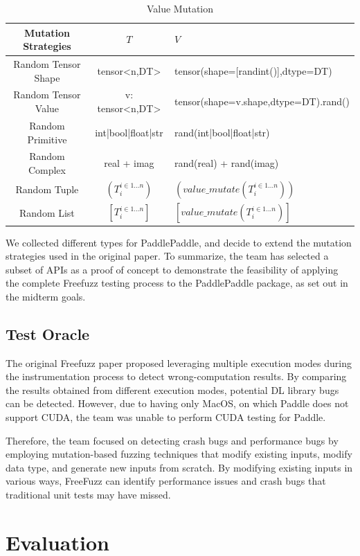 \documentclass[sigconf]{acmart}
\begin{document}
  \begin{table}[h]
    \centering
    \caption{Value Mutation}
    \label{tab:freq}
    \begin{tabular}{ccl}
      \toprule
      Mutation Strategies&$T$&$V$\\
      \midrule
      Random Tensor Shape& tensor<n,DT>& tensor(shape=[randint()],dtype=DT)\\
      Random Tensor Value& v: tensor<n,DT>& tensor(shape=v.shape,dtype=DT).rand()\\
      Random Primitive& int|bool|float|str & rand(int|bool|float|str)\\
      Random Complex& real + imag & rand(real) + rand(imag)\\
      Random Tuple& $(T_i ^ {i\in 1...n})$&$(value\_mutate(T_i ^ {i\in 1...n}))$ \\
      Random List& $[T_i ^ {i\in 1...n}]$&$[value\_mutate(T_i ^ {i\in 1...n})]$ \\
    \bottomrule
  \end{tabular}
  \end{table}


  We collected different types for PaddlePaddle, and decide to extend the mutation strategies used in the original paper.
  To summarize, the team has selected a subset of APIs as a proof of concept to 
  demonstrate the feasibility of applying the complete Freefuzz testing process to the PaddlePaddle package, 
  as set out in the midterm goals.

  \subsection{Test Oracle}
  The original Freefuzz paper proposed leveraging multiple execution modes during the instrumentation process to detect wrong-computation results. 
  By comparing the results obtained from different execution modes, potential DL library bugs can be detected. However, due to having only MacOS, 
  on which Paddle does not support CUDA, the team was unable to perform CUDA testing for Paddle.

  Therefore, the team focused on detecting crash bugs and performance bugs by employing mutation-based fuzzing techniques that modify existing inputs, modify data type, and generate new inputs from scratch. 
  By modifying existing inputs in various ways, FreeFuzz can identify performance issues and crash bugs that traditional unit tests may have missed.

\section{Evaluation}
\end{document}
